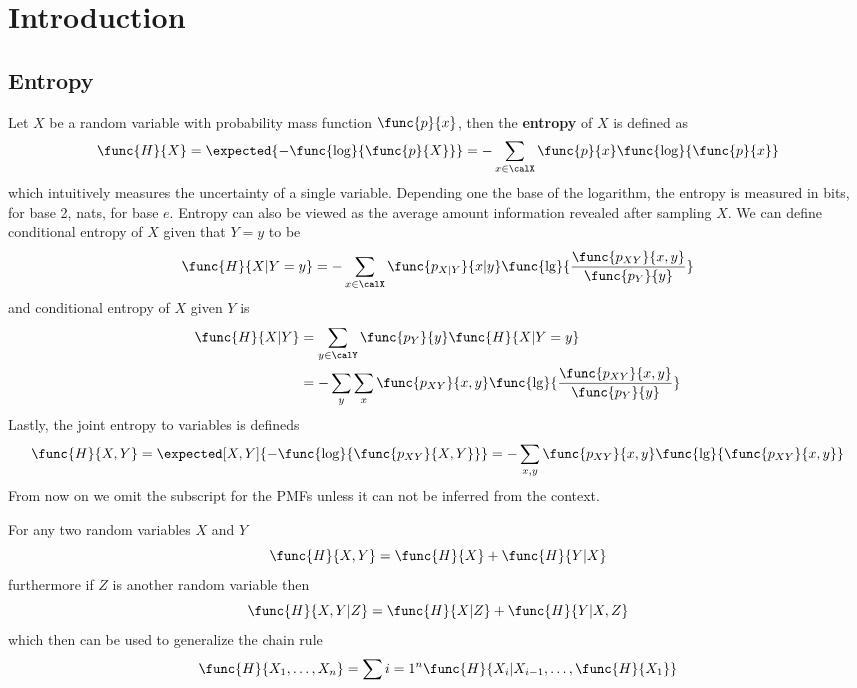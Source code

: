 \chapter{Introduction}
\section{Entropy}
Let \(X\) be a random variable with probability mass function \(\func{p}{x}\), then the \textbf{entropy} of \(X\) is defined as 
\begin{equation*}
      \func{H}{X} = \expected{- \func{\log}{\func{p}{X}}} = - \sum_{x \in \calX} \func{p}{x} \func{\log}{\func{p}{x}}
\end{equation*}
which intuitively measures the uncertainty of a single variable. Depending one the base of the logarithm, the entropy is measured in bits, for base 2, nats, for base \(e\). Entropy can also be viewed as the average amount information revealed after sampling \(X\). We can define conditional entropy of \(X\) given that \(Y = y\) to be 
\begin{equation*}
      \func{H}{X | Y = y} = - \sum_{x \in \calX} \func{p_{X|Y}}{x|y} \func{\lg}{ \dfrac{\func{p_{XY}}{x,y}} {\func{p_Y}{y}} }
\end{equation*}
and conditional entropy of \(X\) given \(Y\) is 
\begin{align*}
      \func{H}{X | Y} &= \sum_{y \in \calY} \func{p_Y}{y} \func{H}{X | Y = y}\\
      &= - \sum_{y} \sum_{x} \func{p_{XY}}{x,y} \func{\lg}{ \dfrac{\func{p_{XY}}{x,y}}{\func{p_Y}{y}}}
\end{align*}
Lastly, the joint entropy to variables is defineds
\begin{equation*}
      \func{H}{X,Y} = \expected[X,Y]{-\func{\log}{\func{p_{XY}}{X,Y}}} =- \sum_{x,y} \func{p_{XY}}{x,y} \func{\lg}{\func{p_{XY}}{x,y}}
\end{equation*}
From now on we omit the subscript for the PMFs unless it can not be inferred from the context.

\begin{proposition}
      For any two random variables \(X\) and \(Y\)
      \begin{equation*}
            \func{H}{X,Y} = \func{H}{X} + \func{H}{Y|X}
      \end{equation*}
      furthermore if \(Z\) is another random variable then 
      \begin{equation*}
            \func{H}{X,Y|Z} = \func{H}{X|Z} + \func{H}{Y|X,Z}
      \end{equation*}
      which then can be used to generalize the chain rule
      \begin{equation*}
            \func{H}{X_1, \dots , X_n} = \sum{i = 1}^n \func{H}{X_i | X_{i-1} , \dots , \func{H}{X_1}}
      \end{equation*}
\end{proposition}

